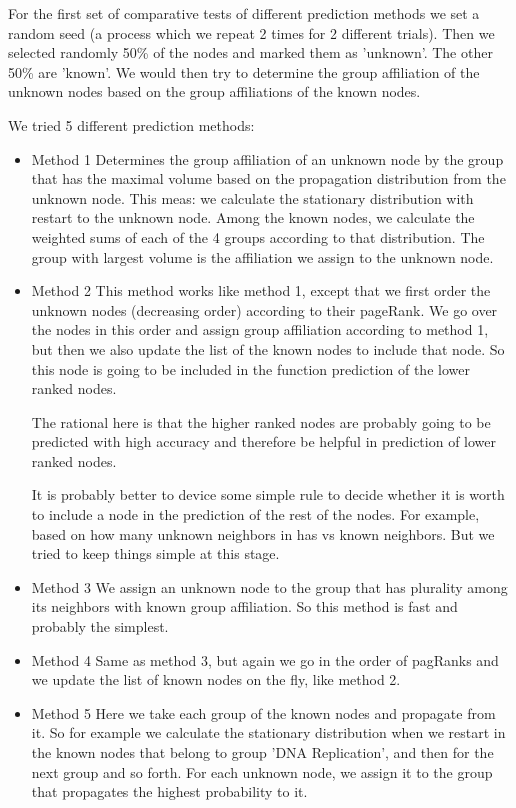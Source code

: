 For the first set of comparative tests of different prediction
methods 
we set a random seed (a process which we repeat 2 times for 2 different trials).
Then we selected randomly 50\% of the nodes and marked them as 'unknown'. The other
50\% are 'known'. We would then try to determine the group affiliation of the
unknown nodes based on the group affiliations of the known nodes.

We tried 5 different prediction methods:

\begin{itemize}
\item{Method 1} Determines the group affiliation of an unknown node by the group
that has the maximal volume based on the propagation distribution from the
unknown node. This meas: we calculate the stationary distribution with restart
to the unknown node. Among the known nodes, we calculate the weighted sums of
each of the 4 groups according to that distribution. The group with largest
volume is the affiliation we assign to the unknown node.

\item{Method 2} This method works like method 1, except that we first order the
unknown nodes (decreasing order) according to their pageRank. We go over the
nodes in this order and assign group affiliation according to method 1, but then
we also update the list of the known nodes to include that node. So this node is
going to be included in the function prediction of the lower ranked nodes.

The rational here is that the higher ranked nodes are probably going to be
predicted with high accuracy and therefore be helpful in prediction of lower
ranked nodes. 

It is probably better to device some simple rule to decide whether it is worth
to include a node in the prediction of the rest of the nodes. For example, based
on how many unknown neighbors in has vs known neighbors. But we tried to keep
things simple at this stage.

\item{Method 3} We assign an unknown node to the group that has plurality among
its neighbors with known group affiliation. So this method is fast and
probably the simplest.

\item{Method 4} Same as method 3, but again we go in the order of pagRanks and
we update the list of known nodes on the fly, like method 2.

\item{Method 5} Here we take each group of the known nodes and propagate from
it. So for example we calculate the stationary distribution when we restart in
the known nodes that belong to group 'DNA Replication', and then for the next
group and so forth. For each unknown node, we assign it to the group that
propagates the highest probability to it.


\end{itemize}
